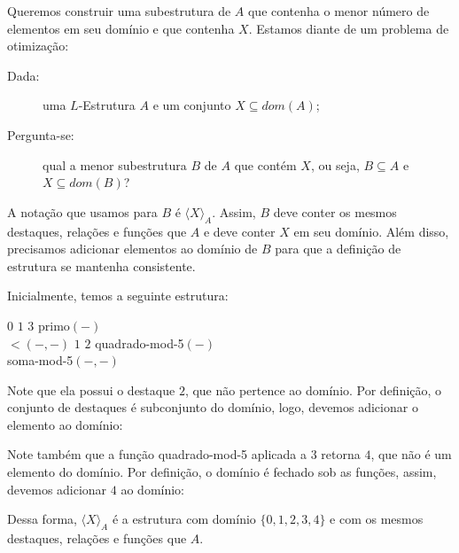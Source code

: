 Queremos construir uma subestrutura de $A$ que contenha o menor número de elementos em seu domínio e que contenha $X$. Estamos diante de um problema de otimização:

\begin{description}
    \item[Dada:] uma $L$-Estrutura $A$ e um conjunto $X \subseteq dom(A)$;
    \item[Pergunta-se:] qual a menor subestrutura $B$ de $A$ que contém $X$, ou seja, $B \subseteq A$ e $X \subseteq dom(B)$?   
\end{description}
A notação que usamos para $B$ é $\langle X \rangle_A$. Assim, $B$ deve conter os mesmos destaques, relações e funções que $A$ e deve conter $X$ em seu domínio. Além disso, precisamos adicionar elementos ao domínio de $B$ para que a definição de estrutura se mantenha consistente. 

Inicialmente, temos a seguinte estrutura:
\begin{center}
    \begin{structure}
        {}
        {$0$ $1$ $3$}
        {primo$(-)$\\$<$$(-,-)$}
        {$1$ $2$}
        {quadrado-mod-5$(-)$\\soma-mod-5$(-,-)$}
    \end{structure} 
\end{center}

Note que ela possui o destaque $2$, que não pertence ao domínio. Por definição, o conjunto de destaques é subconjunto do domínio, logo, devemos adicionar o elemento ao domínio:
\begin{center}
\end{center}

Note também que a função quadrado-mod-5 aplicada a $3$ retorna $4$, que não é um elemento do domínio. Por definição, o domínio é fechado sob as funções, assim, devemos adicionar $4$ ao domínio:

\begin{center}
\end{center}

Dessa forma, $\langle X \rangle_A$ é a estrutura com domínio $\{0,1,2,3,4\}$ e com os mesmos destaques, relações e funções que $A$. 

